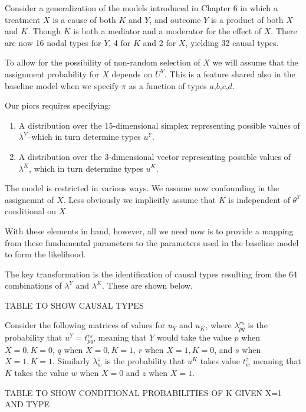 \documentclass[
  12pt,
]{book}
\providecommand{\tightlist}{%
  \setlength{\itemsep}{0pt}\setlength{\parskip}{0pt}}
\begin{document}
Consider a generalization of the models introduced in Chapter 6 in which a treatment \(X\) is a cause of both \(K\) and \(Y\), and outcome \(Y\) is a product of both \(X\) and \(K\). Though \(K\) is both a mediator and a moderator for the effect of \(X\). There are now 16 nodal types for \(Y\), 4 for \(K\) and 2 for \(X\), yielding 32 causal types.

To allow for the possibility of non-random selection of \(X\) we will assume that the assignment probability for \(X\) depends on \(U^Y\). This is a feature shared also in the baseline model when we specify \(\pi\) as a function of types \(a\),\(b\),\(c\),\(d\).

Our piors requires specifying:

\begin{enumerate}
\def\labelenumi{\arabic{enumi}.}
\tightlist
\item
  A distribution over the 15-dimensional simplex representing possible values of \(\lambda^Y\)--which in turn determine types \(u^Y\).
\item
  A distribution over the 3-dimensional vector representing possible values of \(\lambda^K\), which in turn determine types \(u^K\).
\end{enumerate}

The model is restricted in various ways. We assume now confounding in the assignemnt of \(X\). Less obviously we implicitly assume that \(K\) is independent of \(\theta^Y\) conditional on \(X\).

With these elements in hand, however, all we need now is to provide a mapping from these fundamental parameters to the parameters used in the baseline model to form the likelihood.

The key transformation is the identification of causal types resulting from the 64 combinations of \(\lambda^Y\) and \(\lambda^K\). These are shown below.

TABLE TO SHOW CAUSAL TYPES

Consider the following matrices of values for \(u_Y\) and \(u_K\), where \(\lambda_{pq}^{rs}\) is the probability that \(u^Y = t_{pq}^{rs}\), meaning that \(Y\) would take the value \(p\) when \(X=0, K=0\), \(q\) when \(X=0, K=1\), \(r\) when \(X=1, K=0\), and \(s\) when \(X=1, K=1\). Similarly \(\lambda_{w}^{z}\) is the probability that \(u^K\) takes value \(t_{w}^{z}\) meaning that \(K\) takes the value \(w\) when \(X=0\) and \(z\) when \(X=1\).

TABLE TO SHOW CONDITIONAL PROBABILITIES OF K GIVEN X=1 AND TYPE
\end{document}
